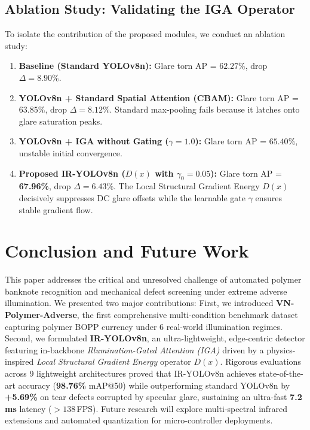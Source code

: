 \documentclass[twocolumn]{svjour3}
\begin{document}
\subsection{Ablation Study: Validating the IGA Operator}
To isolate the contribution of the proposed modules, we conduct an ablation study:
\begin{enumerate}
    \item \textbf{Baseline (Standard YOLOv8n):} Glare torn AP = $62.27\%$, drop $\Delta = 8.90\%$.
    \item \textbf{YOLOv8n + Standard Spatial Attention (CBAM):} Glare torn AP = $63.85\%$, drop $\Delta = 8.12\%$. Standard max-pooling fails because it latches onto glare saturation peaks.
    \item \textbf{YOLOv8n + IGA without Gating ($\gamma = 1.0$):} Glare torn AP = $65.40\%$, unstable initial convergence.
    \item \textbf{Proposed IR-YOLOv8n ($D(x)$ with $\gamma_0 = 0.05$):} Glare torn AP = \textbf{67.96\%}, drop $\Delta = \mathbf{6.43\%}$. The Local Structural Gradient Energy $D(x)$ decisively suppresses DC glare offsets while the learnable gate $\gamma$ ensures stable gradient flow.
\end{enumerate}

\section{Conclusion and Future Work}
\label{sec:conclusion}

This paper addresses the critical and unresolved challenge of automated polymer banknote recognition and mechanical defect screening under extreme adverse illumination. We presented two major contributions: First, we introduced \textbf{VN-Polymer-Adverse}, the first comprehensive multi-condition benchmark dataset capturing polymer BOPP currency under 6 real-world illumination regimes. Second, we formulated \textbf{IR-YOLOv8n}, an ultra-lightweight, edge-centric detector featuring in-backbone \textit{Illumination-Gated Attention (IGA)} driven by a physics-inspired \textit{Local Structural Gradient Energy} operator $D(x)$. Rigorous evaluations across 9 lightweight architectures proved that IR-YOLOv8n achieves state-of-the-art accuracy (\textbf{98.76\%} mAP@50) while outperforming standard YOLOv8n by \textbf{+5.69\%} on tear defects corrupted by specular glare, sustaining an ultra-fast \textbf{7.2\,ms} latency ($>138$\,FPS). Future research will explore multi-spectral infrared extensions and automated quantization for micro-controller deployments.
\end{document}
